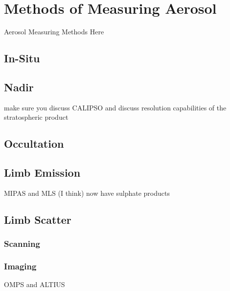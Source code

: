 \section{Methods of Measuring Aerosol}

Aerosol Measuring Methods Here

\subsection{In-Situ}
\subsection{Nadir}

make sure you discuss CALIPSO and discuss resolution capabilities of the stratospheric product

\subsection{Occultation}
\subsection{Limb Emission}

MIPAS and MLS (I think) now have sulphate products

\subsection{Limb Scatter}
\subsubsection{Scanning}
\subsubsection{Imaging} 

OMPS and ALTIUS